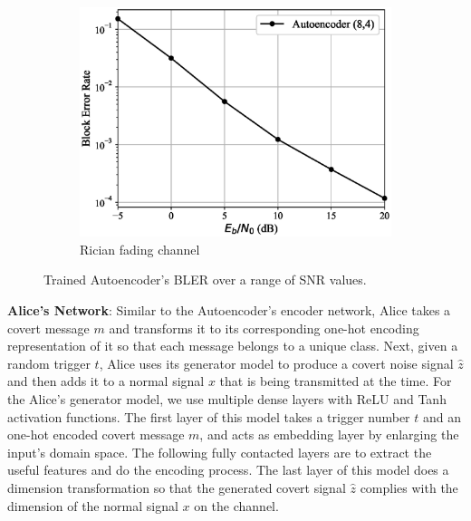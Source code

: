 \begin{figure}[!tp]
\begin{subfigure}{0.3\textwidth}
		\includegraphics[width=\linewidth]{figs/autoencoder_bler_rician}
		\caption{Rician fading channel}	
	\end{subfigure}
	\caption{Trained Autoencoder's BLER over a range of SNR values.}
	\label{fig:autoencoder_bler}
\end{figure}

\textbf{Alice's Network}: Similar to the Autoencoder's encoder network, Alice takes a covert message \(m\) and transforms it to its corresponding one-hot encoding representation of it so that each message belongs to a unique class. Next, given a random trigger \(t\), Alice uses its generator model to produce a covert noise signal \(\hat{z}\) and then adds it to a normal signal \(x\) that is being transmitted at the time. For the Alice's generator model, we use multiple dense layers with ReLU and Tanh activation functions. The first layer of this model takes a trigger number \(t\) and an one-hot encoded covert message \(m\), and acts as embedding layer by enlarging the input's domain space. The following fully contacted layers are to extract the useful features and do the encoding process. The last layer of this model does a dimension transformation so that the generated covert signal \(\hat{z}\) complies with the dimension of the normal signal \(x\) on the channel. 

